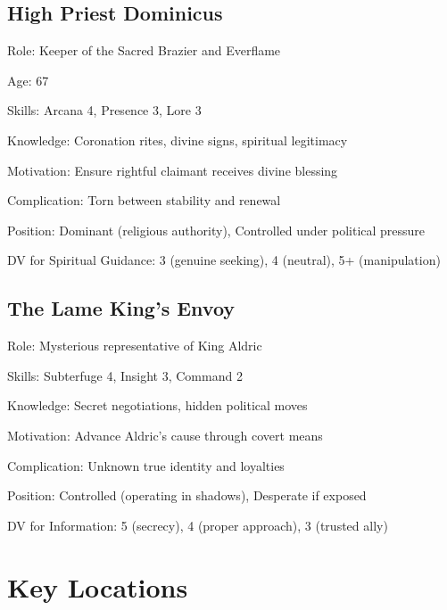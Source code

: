 \documentclass[11pt]{article}
\newenvironment{npc}[1]{\begin{description}[leftmargin=*,style=standard]\item[\textbf{#1}]}{\end{description}}
\begin{document}
\subsection{High Priest Dominicus}
\begin{npc}{High Priest Dominicus}
\item[Role:] Keeper of the Sacred Brazier and Everflame
\item[Age:] 67
\item[Skills:] Arcana 4, Presence 3, Lore 3
\item[Knowledge:] Coronation rites, divine signs, spiritual legitimacy
\item[Motivation:] Ensure rightful claimant receives divine blessing
\item[Complication:] Torn between stability and renewal
\item[Position:] Dominant (religious authority), Controlled under political pressure
\item[DV for Spiritual Guidance:] 3 (genuine seeking), 4 (neutral), 5+ (manipulation)
\end{npc}

\subsection{The Lame King's Envoy}
\begin{npc}{The Lame King's Envoy}
\item[Role:] Mysterious representative of King Aldric
\item[Skills:] Subterfuge 4, Insight 3, Command 2
\item[Knowledge:] Secret negotiations, hidden political moves
\item[Motivation:] Advance Aldric's cause through covert means
\item[Complication:] Unknown true identity and loyalties
\item[Position:] Controlled (operating in shadows), Desperate if exposed
\item[DV for Information:] 5 (secrecy), 4 (proper approach), 3 (trusted ally)
\end{npc}

\section{Key Locations}
\end{document}
